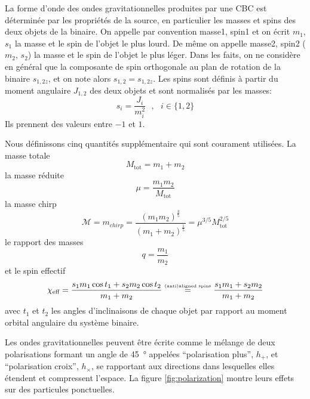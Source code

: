 La forme d'onde des ondes gravitationnelles produites par une CBC est déterminée par les propriétés de la source, en particulier les masses et spins des deux objets de la binaire.
On appelle par convention masse1, spin1 et on écrit $m_1$, $s_1$ la masse et le spin de l'objet le plus lourd.
De même on appelle masse2, spin2 ($m_2$, $s_2$) la masse et le spin de l'objet le plus léger.
Dans les faits, on ne considère en général que la composante de spin orthogonale au plan de rotation de la binaire $s_{1,2z}$, et on note alors $s_{1,2}=s_{1,2z}$.
Les spins sont définis à partir du moment angulaire $J_{1,2}$ des deux objets et sont normalisés par les masses:
\begin{equation}
  s_i = \frac{J_i}{m^2_i} \text{  }, \text{  } i \in \{1,2\}
  \label{eq:spin}
\end{equation}
Ils prennent des valeurs entre $-1$ et $1$.

Nous définissons cinq quantités supplémentaire qui sont courament utilisées.
La masse totale
%
\begin{equation}
  M_{\textrm{tot}} = m_1 + m_2
\end{equation}
%
la masse réduite
%
\begin{equation}
  \mu = \frac{m_1 m_2}{M_{\textrm{tot}}}
\end{equation}
%
la masse chirp
%
\begin{equation}
  \mathcal{M} = m_{chirp} = \frac{ \left( m_1m_2 \right)^{\frac{3}{5}} }{ \left( m_1 + m_2 \right)^{\frac{1}{5}} } = \mu^{3/5}M_{\textrm{tot}}^{2/5}
  \label{eq:mchirp}
\end{equation}
%
le rapport des masses
%
\begin{equation}
  q=\frac{m_1}{m_2}
\end{equation}
%
et le spin effectif
%
\begin{equation}
  \chi_{\textrm{eff}} = \frac{s_1m_1\cos t_1 + s_2m_2\cos t_2}{m_1 + m_2} \stackrel{\textrm{\tiny (anti)aligned spins}}{=} \frac{s_1 m_1 + s_2 m _2}{m_1 + m_2}
  \label{eq:spin_eff}
\end{equation}
%
avec $t_1$ et $t_2$ les angles d'inclinaisons de chaque objet par rapport au moment orbital angulaire du système binaire.

%
Les ondes gravitationnelles peuvent être écrite comme le mélange de deux polarisations formant un angle de \SI{45}{\degree} \cite{polarization} appelées ``polarisation plus'', $h_+$, et ``polarisation croix'', $h_\times$, se rapportant aux directions dans lesquelles elles étendent et compressent l'espace.
La figure \ref{fig:polarization} montre leurs effets sur des particules ponctuelles.

